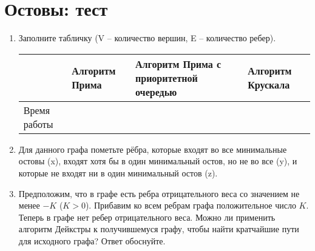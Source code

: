 \documentclass[a4paper,10pt]{article}
\begin{document}
  \section{Остовы: тест}

  \begin{enumerate}
    \item
      Заполните табличку (V – количество вершин, E – количество ребер).
      \vspace{-0.5cm}
      \begin{center}
        \begin{tabular}{|p{2.5cm}|p{4cm}|p{4cm}|p{4cm}|}
          \hline
          & Алгоритм Прима & Алгоритм Прима с приоритетной очередью & Алгоритм Крускала \\
          \hline
          Время работы & & & \\
          \hline
        \end{tabular}
      \end{center}

    \item Для данного графа пометьте рёбра, которые входят во все минимальные
    остовы (x), входят хотя бы в один минимальный остов, но не во все (y),
    и которые не входят ни в один минимальный остов (z).

    \begin{center}
    \end{center}

    \item Предположим, что в графе есть ребра отрицательного веса со значением
    не менее $-K$ ($K>0$). Прибавим ко всем ребрам графа положительное число $K$.
    Теперь в графе нет ребер отрицательного веса. Можно ли применить алгоритм
    Дейкстры к получившемуся графу, чтобы найти кратчайшие пути для исходного
    графа? Ответ обоснуйте.


\end{enumerate}
\end{document}
